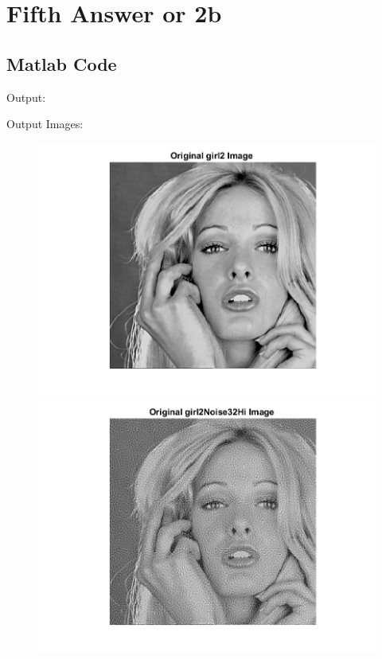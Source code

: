 \documentclass[11pt]{article} %
\begin{document}
\section {Fifth Answer or 2b}
\subsection*{Matlab Code}


Output:


Output Images: 
\begin{figure}
 \centering
	\includegraphics{2ba.png}
	\includegraphics{2bb.png}
\end{figure}
\end{document}
